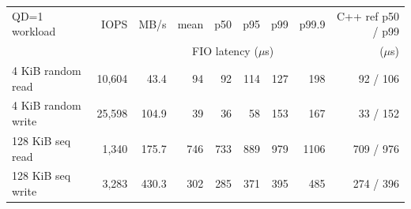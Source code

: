 \begin{tabular}{lrrrrrrrr}
\toprule
QD=1 workload & IOPS & MB/s & mean & p50 & p95 & p99 & p99.9 & C++ ref p50 / p99 \\
 & & & \multicolumn{4}{c}{FIO latency ($\mu$s)} & & ($\mu$s) \\
\midrule
4 KiB random read & 10,604 & 43.4 & 94 & 92 & 114 & 127 & 198 & 92 / 106 \\
4 KiB random write & 25,598 & 104.9 & 39 & 36 & 58 & 153 & 167 & 33 / 152 \\
128 KiB seq read & 1,340 & 175.7 & 746 & 733 & 889 & 979 & 1106 & 709 / 976 \\
128 KiB seq write & 3,283 & 430.3 & 302 & 285 & 371 & 395 & 485 & 274 / 396 \\
\bottomrule
\end{tabular}
